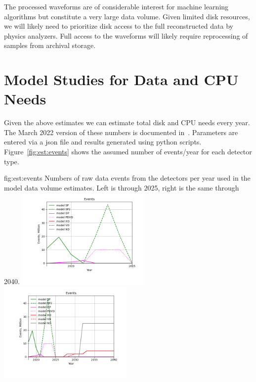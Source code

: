 \documentclass[../main-v1.tex]{subfiles}
\begin{document}
The processed waveforms are of considerable interest for machine learning algorithms but constitute a very large data volume.  Given limited disk resources, we will likely need to prioritize disk access to the full reconstructed data by physics analyzers. Full access to the waveforms will likely require reprocessing of samples from archival storage. 

\section{Model Studies for Data and CPU Needs }
\label{sec:est:volumes}

Given the above estimates we can  estimate total disk and CPU needs every year.  The March 2022 version of these numbers is documented in~\cite{bib:docdb24732}.  Parameters are entered via a json file and results generated using python scripts. Figure~\ref{fig:est:events} shows the assumed number of events/year for each detector type.  

\begin{dunefigure}
{fig:est:events}
{Numbers of raw data events from the detectors per year used in the model data volume estimates. Left is through 2025, right is the same through 2040.  }
\includegraphics[width=0.49\textwidth]{graphics/IntroFigures/2025/Parameters_2022-03-04-2025-Events.png}
\includegraphics[width=0.49\textwidth]{graphics/IntroFigures/2040/Parameters_2022-03-04-2040-Events.png}
\end{dunefigure}
\end{document}
